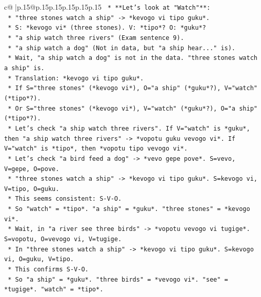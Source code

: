 \documentclass{article}
\begin{document}
{\begin{supertabular}{c@{$\;$}|p{.15\linewidth}@{}p{.15\linewidth}p{.15\linewidth}p{.15\linewidth}p{.15\linewidth}p{.15\linewidth}}
{{{\texttt{                *   **Let's look at "Watch"**:} \\
\texttt{                    *   "three stones watch a ship" {-}> *kevogo vi tipo guku*.} \\
\texttt{                    *   S: *kevogo vi* (three stones). V: *tipo*? O: *guku*?} \\
\texttt{                    *   "a ship watch three rivers" (Exam sentence 9).} \\
\texttt{                    *   "a ship watch a dog" (Not in data, but "a ship hear..." is).} \\
\texttt{                    *   Wait, "a ship watch a dog" is not in the data. "three stones watch a ship" is.} \\
\texttt{                    *   Translation: *kevogo vi tipo guku*.} \\
\texttt{                    *   If S="three stones" (*kevogo vi*), O="a ship" (*guku*?), V="watch" (*tipo*?).} \\
\texttt{                    *   Or S="three stones" (*kevogo vi*), V="watch" (*guku*?), O="a ship" (*tipo*?).} \\
\texttt{                    *   Let's check "a ship watch three rivers". If V="watch" is *guku*, then "a ship watch three rivers" {-}> *vopotu guku vevogo vi*. If V="watch" is *tipo*, then *vopotu tipo vevogo vi*.} \\
\texttt{                    *   Let's check "a bird feed a dog" {-}> *vevo gepe pove*. S=vevo, V=gepe, O=pove.} \\
\texttt{                    *   "three stones watch a ship" {-}> *kevogo vi tipo guku*. S=kevogo vi, V=tipo, O=guku.} \\
\texttt{                    *   This seems consistent: S{-}V{-}O.} \\
\texttt{                    *   So "watch" = *tipo*. "a ship" = *guku*. "three stones" = *kevogo vi*.} \\
\texttt{                    *   Wait, in "a river see three birds" {-}> *vopotu vevogo vi tugige*. S=vopotu, O=vevogo vi, V=tugige.} \\
\texttt{                    *   In "three stones watch a ship" {-}> *kevogo vi tipo guku*. S=kevogo vi, O=guku, V=tipo.} \\
\texttt{                    *   This confirms S{-}V{-}O.} \\
\texttt{                    *   So "a ship" = *guku*. "three birds" = *vevogo vi*. "see" = *tugige*. "watch" = *tipo*.} \\
}}}
\end{supertabular}}
\end{document}
